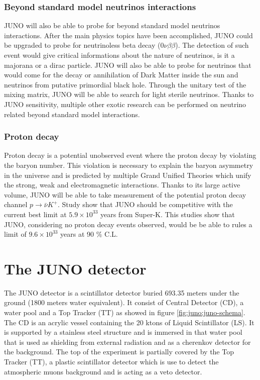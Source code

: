 \documentclass[../main.tex]{subfiles}
\begin{document}
\subsubsection{Beyond standard model neutrinos interactions}

JUNO will also be able to probe for beyond standard model neutrinos interactions. After the main physics topics have been accomplished, JUNO could be upgraded to probe for neutrinoless beta decay ($0\nu\beta\beta$). The detection of such event would give critical informations about the nature of neutrinos, is it a majorana or a dirac particle. JUNO will also be able to probe for neutrinos that would come for the decay or annihilation of Dark Matter inside the sun and neutrinos from putative primordial black hole.
Through the unitary test of the mixing matrix, JUNO will be able to search for light sterile neutrinos.
Thanks to JUNO sensitivity, multiple other exotic research can be performed on neutrino related beyond standard model interactions.

\subsubsection{Proton decay}

Proton decay is a potential unobserved event where the proton decay by violating the baryon number. This violation is necessary to explain the baryon asymmetry in the universe and is predicted by multiple Grand Unified Theories which unify the  strong, weak and electromagnetic interactions.
Thanks to its large active volume, JUNO will be able to take measurement of the potential proton decay channel $p \rightarrow \bar{\nu}K^+$. Study \cite{juno_collaboration_juno_2023} show that JUNO should be competitive with the current best limit at $5.9 \times 10^{33}$ years from Super-K. This studies show that JUNO, considering no proton decay events observed, would be be able to rules a limit of $9.6 \times 10^{33}$ years at 90 \% C.L.


\section{The JUNO detector}
\label{sec:juno:juno_detector}

The JUNO detector is a scintillator detector buried 693.35 meters under the ground (1800 meters water equivalent). It consist of Central Detector (CD), a water pool and a Top Tracker (TT) as showed in figure \ref{fig:juno:juno-schema}.
The CD is an acrylic vessel containing the 20 ktons of Liquid Scintillator (LS). It is supported by a stainless steel structure and is immersed in that water pool that is used as shielding from external radiation and as a cherenkov detector for the background. The top of the experiment is partially covered by the Top Tracker (TT), a plastic scintillator detector which is use to detect the atmospheric muons background and is acting as a veto detector.
\end{document}
